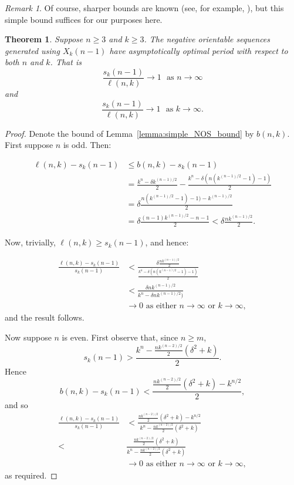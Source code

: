 \documentclass[a4paper,11pt]{article}
\theoremstyle{plain}
\newtheorem{theorem}[lemma]{Theorem}
\theoremstyle{definition}
\theoremstyle{remark}
\newtheorem{remark}{Remark}[section]
\begin{document}
\begin{remark}
Of course, sharper bounds are known (see, for example, \cite[Theorem 3.5]{Mitchell25a}), but this
simple bound suffices for our purposes here.
\end{remark}

\begin{theorem}
Suppose $n\geq3$ and $k\geq3$. The negative orientable sequences generated using $X_k(n-1)$ have
asymptotically optimal period with respect to both $n$ and $k$.  That is
\[ \frac{s_k(n-1)}{\ell(n,k)}\rightarrow 1 \text{~~as~}n\rightarrow\infty \]
and
\[ \frac{s_k(n-1)}{\ell(n,k)}\rightarrow 1 \text{~~as~}k\rightarrow\infty. \]
\end{theorem}

\begin{proof}
Denote the bound of Lemma~\ref{lemma:simple_NOS_bound} by $b(n,k)$.  First suppose $n$ is odd.
Then:


\begin{align*}
\ell(n,k)-s_k(n-1) & \leq b(n,k)-s_k(n-1) \\
& = \frac{k^n-\delta k^{(n-1)/2}}{2} - \frac{k^n-\delta(n(k^{(n-1)/2}-1)-1)}{2} \\
& = \delta\frac{n(k^{(n-1)/2}-1)-1)-k^{(n-1)/2}}{2} \\
& = \delta\frac{(n-1)k^{(n-1)/2}-n-1}{2} < \delta\frac{nk^{(n-1)/2}}{2}.
\end{align*}

Now, trivially, $\ell(n,k)\geq s_k(n-1)$, and hence:

\begin{align*}
\frac{\ell(n,k)-s_k(n-1)}{s_k(n-1)}& < \frac{\delta\frac{nk^{(n-1)/2}}{2}}{\frac{k^n-\delta(n(k^{(n-1)/2}-1)-1)}{2}} \\
& < \frac{\delta nk^{(n-1)/2}}{k^n-\delta nk^{(n-1)/2})} \\
& \rightarrow 0 \text{~as either~} n\rightarrow\infty \text{~or~} k\rightarrow\infty,
\end{align*}
and the result follows.

Now suppose $n$ is even. First observe that, since $n\geq m$,
\[ s_k(n-1) > \frac{k^n - \frac{nk^{(n-2)/2}}{2}(\delta^2+k)}{2}. \]
Hence
\[ b(n,k)-s_k(n-1) < \frac{\frac{nk^{(n-2)/2}}{2}(\delta^2+k) - k^{n/2}}{2}, \]
and so
\begin{align*}
\frac{\ell(n,k)-s_k(n-1)}{s_k(n-1)} & <
\frac{\frac{nk^{(n-2)/2}}{2}(\delta^2+k) - k^{n/2}}{k^n - \frac{nk^{(n-2)/2}}{2}(\delta^2+k)} \\
< & \frac{\frac{nk^{(n-2)/2}}{2}(\delta^2+k)}{k^n - \frac{nk^{(n-2)/2}}{2}(\delta^2+k)} \\
& \rightarrow 0 \text{~as either~} n\rightarrow\infty \text{~or~} k\rightarrow\infty,
\end{align*}
as required.
\end{proof}
\end{document}
